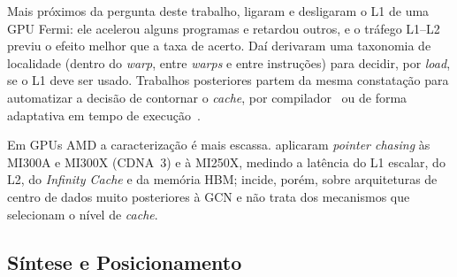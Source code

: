 \documentclass[12pt]{article}
\begin{document}
Mais próximos da pergunta deste trabalho, \cite{jia2012} ligaram e desligaram o L1 de uma GPU Fermi: ele acelerou alguns programas e retardou outros, e o tráfego L1--L2 previu o efeito melhor que a taxa de acerto. Daí derivaram uma taxonomia de localidade (dentro do \textit{warp}, entre \textit{warps} e entre instruções) para decidir, por \textit{load}, se o L1 deve ser usado. Trabalhos posteriores partem da mesma constatação para automatizar a decisão de contornar o \textit{cache}, por compilador~\cite{xie2013} ou de forma adaptativa em tempo de execução~\cite{tian2015}.

Em GPUs AMD a caracterização é mais escassa. \cite{tee2025} aplicaram \textit{pointer chasing} às MI300A e MI300X (CDNA~3) e à MI250X, medindo a latência do L1 escalar, do L2, do \textit{Infinity Cache} e da memória HBM; incide, porém, sobre arquiteturas de centro de dados muito posteriores à GCN e não trata dos mecanismos que selecionam o nível de \textit{cache}.

\subsection{Síntese e Posicionamento}
\end{document}
